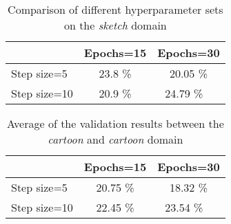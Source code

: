 \documentclass[11pt,twoside,a4paper]{article}
\begin{document}
\begin{table}[!h]
  \begin{adjustwidth}{-.5in}{-.5in}
  \begin{center}
    \begin{tabular}{l | c | c}
        & Epochs=15 & Epochs=30 \\
      \hline
	Step size=5 & 23.8 \% & 20.05 \% \\
	Step size=10 & 20.9 \% & 24.79 \% \
    \end{tabular}
    \caption{Comparison of different hyperparameter sets on the \textit{sketch} domain}
    \label{noda:sketch}
  \end{center}
  \end{adjustwidth}
\end{table}

\begin{table}[!h]
  \begin{adjustwidth}{-.5in}{-.5in}
  \begin{center}
    \begin{tabular}{l | c | c}
        & Epochs=15 & Epochs=30 \\
      \hline
	Step size=5 & 20.75 \% & 18.32 \% \\
	Step size=10 & 22.45 \% & 23.54 \% \
    \end{tabular}
    \caption{Average of the validation results between the \textit{cartoon} and \textit{cartoon} domain}
    \label{noda:avg}
  \end{center}
  \end{adjustwidth}
\end{table}
\end{document}
